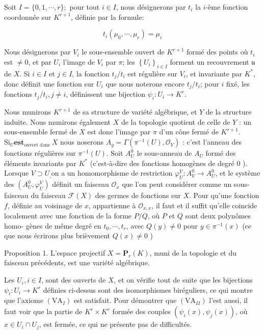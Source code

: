 Soit $I=\{0,1, \cdots, r\} ;$ pour tout $i \in I$, nous désignerons par $t_{i}$ la $i$-ème fonction coordonnée sur $K^{r+1}$, définie par la formule:

$$
t_{i}\left(\mu_{0}, \cdots, \mu_{r}\right)=\mu_{i}
$$

Nous désignerons par $V_{i}$ le sous-ensemble ouvert de $K^{r+1}$ formé des points où $t_{i}$ est $\neq 0$, et par $U_{i}$ l'image de $V_{i}$ par $\pi$; les $\left\{U_{i}\right\}_{i \in I}$ forment un recouvrement $\mathfrak{u}$ de $X$. Si $i \in I$ et $j \in I$, la fonction $t_{j} / t_{i}$ est régulière sur $V_{i}$, et invariante par $K^{*}$, donc définit une fonction sur $U_{i}$ que nous noterons encore $t_{j} / t_{i}$; pour $i$ fixé, les fonctions $t_{j} / t_{i}, j \neq i$, définissent une bijection $\psi_{i}: U_{i} \rightarrow K^{r}$.

Nous munirons $K^{r+1}$ de sa structure de variété algébrique, et $Y$ de la structure induite. Nous munirons également $X$ de la topologie quotient de celle de $Y$ : un sous-ensemble fermé de $X$ est donc l'image par $\pi$ d'un cône fermé de $K^{r+1}$. $\mathrm{Si}_{U} \boldsymbol{e s t}_{\text {ouvert dans }} X$ nous noserons $A_{y}=\Gamma\left(\pi^{-1}(U), \mathcal{O}_{Y}\right)$ : c'est l'anneau des fonctions régulières sur $\pi^{-1}(U) .$ Soit $A_{U}^{0}$ le sous-anneau de $A_{U}$ formé des éléments invariants par $K^{*}$ (c'est-à-dire des fonctions homogènes de degré 0 ). Lorsque $V \supset U_{,}$on a un homomorphisme de restriction $\varphi_{U}^{V}: A_{V}^{0} \rightarrow A_{U}^{0}$, et le système des $\left(A_{U}^{0}, \varphi_{U}^{V}\right)$ définit un faisceau $\mathcal{O}_{x}$ que l'on peut considérer comme un sous-faisceau du faisceau $\mathcal{F}(X)$ des germes de fonctions sur $X$. Pour qu'une fonction $f$, définie au voisinage de $x$, appartienne à $\mathcal{O}_{x, x}$, il faut et il suffit qu'elle coincide localement avec une fonction de la forme $P / Q$, où $P$ et $Q$ sont deux polynômes homo- gènes de même degré en $t_{0}, \cdots, t_{r}$, avec $Q(y) \neq 0$ pour $y \in \pi^{-1}(x)$ (ce que nous écrirons plus brièvement $Q(x) \neq 0$ )

Proposition 1. L'espace projectif $X=\mathbf{P}_{r}(K)$, muni de la topologie et du faisceau précédents, est une variété algébrique.

Les $U_{i}, i \in I$, sont des ouverts de $X$, et on vérifie tout de suite que les bijections $\psi_{i}: U_{i} \rightarrow K^{r}$ définies ci-dessus sont des isomorphismes biréguliers, ce qui montre que l'axiome $\left(\mathrm{VA}_{I}\right)$ est satisfait. Pour démontrer que $\left(\mathrm{VA}_{I I}\right)$ l'est aussi, il faut voir que la partie de $K^{r} \times K^{r}$ formée des couples $\left(\psi_{i}(x), \psi_{j}(x)\right)$, où $x \in U_{i} \cap U_{j}$, est fermée, ce qui ne présente pas de difficultés.

